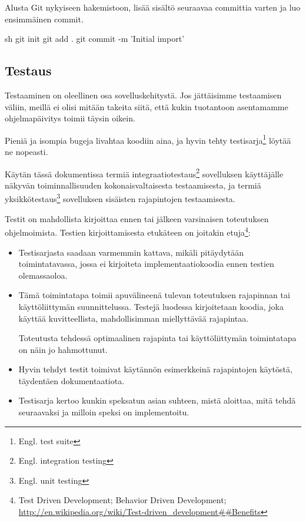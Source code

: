 \documentclass{article}
\newcommand{\en}[1]{\foreignlanguage{english}{#1}}
\begin{document}
\begin{samepage}
Alusta Git nykyiseen hakemistoon, lisää sisältö seuraavaa committia varten ja
luo ensimmäinen commit.

\begin{pygmented}{sh}
git init
git add .
git commit -m 'Initial import'
\end{pygmented}
\end{samepage}

\subsection{Testaus}

Testaaminen on oleellinen osa sovelluskehitystä. Jos jättäisimme testaamisen
väliin, meillä ei olisi mitään takeita siitä, että kukin tuotantoon asentamamme
ohjelmapäivitys toimii täysin oikein.

Pieniä ja isompia bugeja livahtaa koodiin aina, ja hyvin tehty
testisarja\footnote{Engl. \en{test suite}} löytää ne nopeasti.

Käytän tässä dokumentissa termiä integraatiotestaus\footnote{Engl.
\en{integration testing}} sovelluksen käyttäjälle näkyvän toiminnallisuuden
kokonaisvaltaisesta testaamisesta, ja termiä yksikkötestaus\footnote{Engl.
\en{unit testing}} sovelluksen sisäisten rajapintojen testaamisesta.

Testit on mahdollista kirjoittaa ennen tai jälkeen varsinaisen toteutuksen
ohjelmoimista. Testien kirjoittamisesta etukäteen on joitakin
etuja\footnote{\en{Test Driven Development; Behavior Driven Development;
\url{http://en.wikipedia.org/wiki/Test-driven\_development##Benefits}}}:

\begin{itemize}
\item
Testisarjasta saadaan varmemmin kattava, mikäli pitäydytään toimintatavassa,
jossa ei kirjoiteta implementaatiokoodia ennen testien olemassaoloa.

\item
Tämä toimintatapa toimii apuvälineenä tulevan toteutuksen rajapinnan tai
käyttöliittymän suunnittelussa. Testejä luodessa kirjoitetaan koodia, joka
käyttää kuvitteellista, mahdollisimman miellyttävää rajapintaa.

Toteutusta tehdessä optimaalinen rajapinta tai käyttöliittymän toimintatapa on
näin jo hahmottunut.

\item
Hyvin tehdyt testit toimivat käytännön esimerkkeinä rajapintojen käytöstä,
täydentäen dokumentaatiota.

\item
Testisarja kertoo kunkin speksatun asian suhteen, mistä aloittaa, mitä tehdä
seuraavaksi ja milloin speksi on implementoitu.
\end{itemize}
\end{document}
